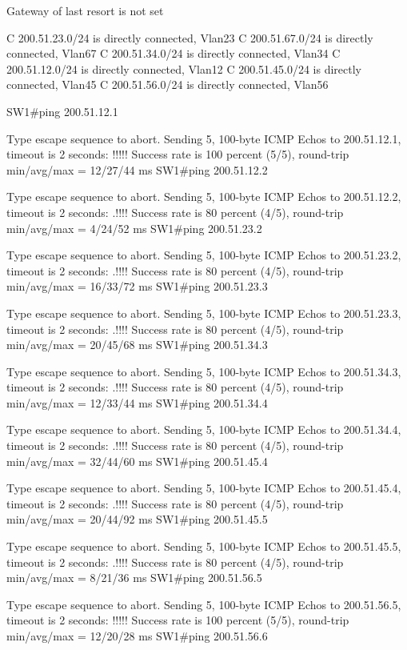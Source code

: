 \documentclass[10pt]{article}
\begin{document}
\begin{itemize}
\begin{verbatim*}
		Gateway of last resort is not set

		C    200.51.23.0/24 is directly connected, Vlan23
		C    200.51.67.0/24 is directly connected, Vlan67
		C    200.51.34.0/24 is directly connected, Vlan34
		C    200.51.12.0/24 is directly connected, Vlan12
		C    200.51.45.0/24 is directly connected, Vlan45
		C    200.51.56.0/24 is directly connected, Vlan56


		SW1#ping 200.51.12.1

		Type escape sequence to abort.
		Sending 5, 100-byte ICMP Echos to 200.51.12.1, timeout is 2 seconds:
		!!!!!
		Success rate is 100 percent (5/5), round-trip min/avg/max = 12/27/44 ms
		SW1#ping 200.51.12.2

		Type escape sequence to abort.
		Sending 5, 100-byte ICMP Echos to 200.51.12.2, timeout is 2 seconds:
		.!!!!
		Success rate is 80 percent (4/5), round-trip min/avg/max = 4/24/52 ms
		SW1#ping 200.51.23.2

		Type escape sequence to abort.
		Sending 5, 100-byte ICMP Echos to 200.51.23.2, timeout is 2 seconds:
		.!!!!
		Success rate is 80 percent (4/5), round-trip min/avg/max = 16/33/72 ms
		SW1#ping 200.51.23.3

		Type escape sequence to abort.
		Sending 5, 100-byte ICMP Echos to 200.51.23.3, timeout is 2 seconds:
		.!!!!
		Success rate is 80 percent (4/5), round-trip min/avg/max = 20/45/68 ms
		SW1#ping 200.51.34.3

		Type escape sequence to abort.
		Sending 5, 100-byte ICMP Echos to 200.51.34.3, timeout is 2 seconds:
		.!!!!
		Success rate is 80 percent (4/5), round-trip min/avg/max = 12/33/44 ms
		SW1#ping 200.51.34.4

		Type escape sequence to abort.
		Sending 5, 100-byte ICMP Echos to 200.51.34.4, timeout is 2 seconds:
		.!!!!
		Success rate is 80 percent (4/5), round-trip min/avg/max = 32/44/60 ms
		SW1#ping 200.51.45.4

		Type escape sequence to abort.
		Sending 5, 100-byte ICMP Echos to 200.51.45.4, timeout is 2 seconds:
		.!!!!
		Success rate is 80 percent (4/5), round-trip min/avg/max = 20/44/92 ms
		SW1#ping 200.51.45.5

		Type escape sequence to abort.
		Sending 5, 100-byte ICMP Echos to 200.51.45.5, timeout is 2 seconds:
		.!!!!
		Success rate is 80 percent (4/5), round-trip min/avg/max = 8/21/36 ms
		SW1#ping 200.51.56.5

		Type escape sequence to abort.
		Sending 5, 100-byte ICMP Echos to 200.51.56.5, timeout is 2 seconds:
		!!!!!
		Success rate is 100 percent (5/5), round-trip min/avg/max = 12/20/28 ms
		SW1#ping 200.51.56.6


\end{verbatim*}
\end{itemize}
\end{document}
